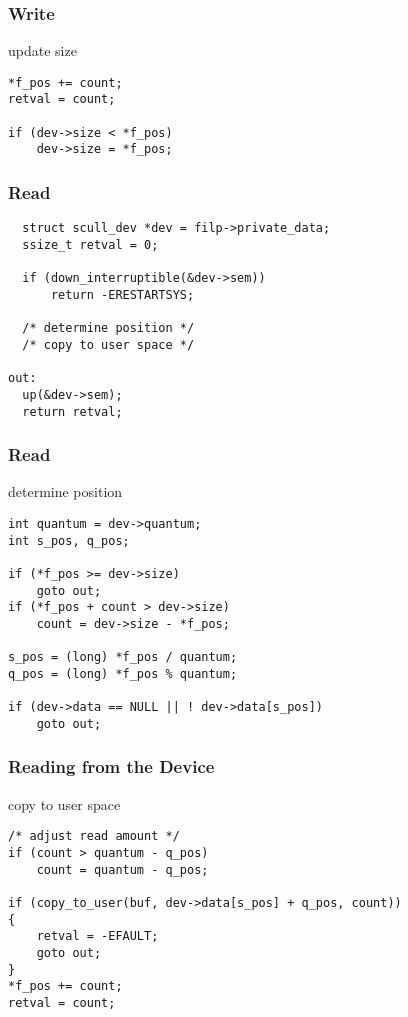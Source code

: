 \documentclass[dvipsnames]{beamer}
\begin{document}
\begin{frame}[fragile]
  \frametitle{Write}

  \begin{exampleblock}{update size}
    \begin{lstlisting}
*f_pos += count;
retval = count;

if (dev->size < *f_pos)
    dev->size = *f_pos;
    \end{lstlisting}
  \end{exampleblock}
\end{frame}

\begin{frame}[fragile]
  \frametitle{Read}

  \begin{exampleblock}{}
    \begin{lstlisting}
  struct scull_dev *dev = filp->private_data;
  ssize_t retval = 0;

  if (down_interruptible(&dev->sem))
      return -ERESTARTSYS;

  /* determine position */
  /* copy to user space */

out:
  up(&dev->sem);
  return retval;
    \end{lstlisting}
  \end{exampleblock}
\end{frame}

\begin{frame}[fragile]
  \frametitle{Read}

  \begin{exampleblock}{determine position}
    \begin{lstlisting}
int quantum = dev->quantum;
int s_pos, q_pos;

if (*f_pos >= dev->size)
    goto out;
if (*f_pos + count > dev->size)
    count = dev->size - *f_pos;

s_pos = (long) *f_pos / quantum;
q_pos = (long) *f_pos % quantum;

if (dev->data == NULL || ! dev->data[s_pos])
    goto out;
    \end{lstlisting}
  \end{exampleblock}
\end{frame}

\begin{frame}[fragile]
  \frametitle{Reading from the Device}

  \begin{exampleblock}{copy to user space}
    \begin{lstlisting}
/* adjust read amount */
if (count > quantum - q_pos)
    count = quantum - q_pos;

if (copy_to_user(buf, dev->data[s_pos] + q_pos, count))
{
    retval = -EFAULT;
    goto out;
}
*f_pos += count;
retval = count;
    \end{lstlisting}
  \end{exampleblock}
\end{frame}
\end{document}
